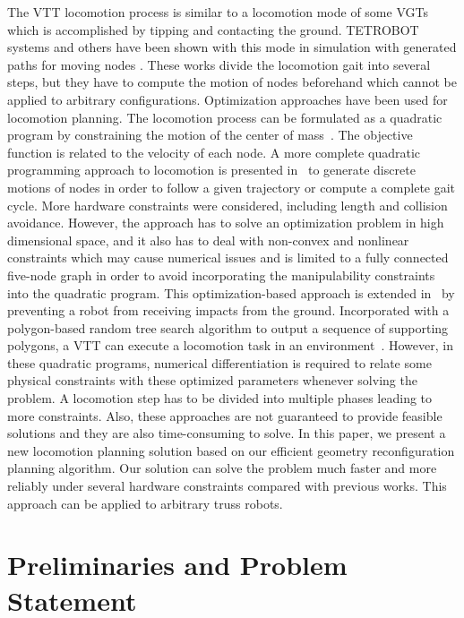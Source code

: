 \documentclass[journal]{IEEEtran}
\begin{document}
The VTT locomotion process is similar to a locomotion mode of some
VGTs which is accomplished by tipping and contacting the
ground. TETROBOT systems and others have been shown with this mode in
simulation with generated paths for moving nodes
\cite{Lee-vgt-locomotion-tra-2002,Abrahantes-tetrahedron-gait-2010}. These
works divide the locomotion gait into several steps, but they have to
compute the motion of nodes beforehand which cannot be applied to
arbitrary configurations. Optimization approaches have been used for
locomotion planning. The locomotion process can be formulated as a
quadratic program by constraining the motion of the center of
mass~\cite{Schwager-lar-iros-2017}. The objective function is related
to the velocity of each node. A more complete quadratic programming
approach to locomotion is presented
in~\cite{Usevitch-lar-locomotion-tro-2020} to generate discrete
motions of nodes in order to follow a given trajectory or compute a
complete gait cycle. More hardware constraints were considered,
including length and collision avoidance. However, the approach has to
solve an optimization problem in high dimensional space, and it also
has to deal with non-convex and nonlinear constraints which may cause
numerical issues and is limited to a fully connected five-node graph
in order to avoid incorporating the manipulability constraints into
the quadratic program. This optimization-based approach is extended
in~\cite{Park-vtt-locomotion-ral-2019} by preventing a robot from
receiving impacts from the ground. Incorporated with a polygon-based
random tree search algorithm to output a sequence of supporting
polygons, a VTT can execute a locomotion task in an
environment~\cite{Park-vtt-locomotion-ral-2020}. However, in these
quadratic programs, numerical differentiation is required to relate
some physical constraints with these optimized parameters whenever
solving the problem. A locomotion step has to be divided into multiple
phases leading to more constraints. Also, these approaches are not
guaranteed to provide feasible solutions and they are also
time-consuming to solve. In this paper, we present a new locomotion
planning solution based on our efficient geometry reconfiguration
planning algorithm. Our solution can solve the problem much faster and
more reliably under several hardware constraints compared with
previous works. This approach can be applied to arbitrary truss
robots.

\section{Preliminaries and Problem Statement}
\label{sec:preliminary}
\end{document}
